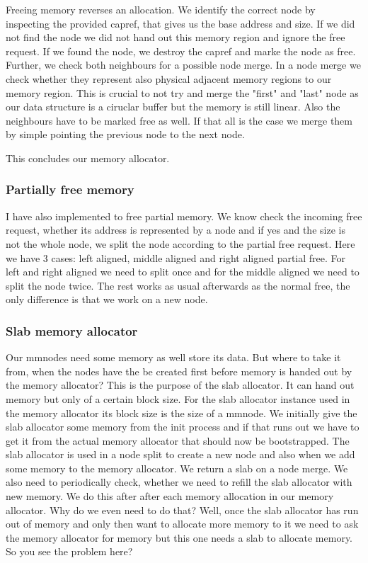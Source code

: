 Freeing memory reverses an allocation. We identify the correct node by inspecting the provided capref, that gives us the base address and size.
If we did not find the node we did not hand out this memory region and ignore the free request.
If we found the node, we destroy the capref and marke the node as free. Further, we check both neighbours for a possible node merge. In a node merge we check whether they represent also physical adjacent memory regions to our memory region. This is crucial to not try and merge the "first" and "last" node as our data structure is a ciruclar buffer but the memory is still linear. Also the neighbours have to be marked free as well. If that all is the case we merge them by simple pointing the previous node to the next node.

This concludes our memory allocator.

\subsubsection{Partially free memory}

I have also implemented to free partial memory. We know check the incoming free request, whether its address is represented by a node and if yes and the size is not the whole node, we split the node according to the partial free request. Here we have 3 cases: left aligned, middle aligned and right aligned partial free. For left and right aligned we need to split once and for the middle aligned we need to split the node twice. The rest works as usual afterwards as the normal free, the only difference is that we work on a new node.

\subsubsection{Slab memory allocator}

Our mmnodes need some memory as well store its data. But where to take it from, when the nodes have the be created first before memory is handed out by the memory allocator?
This is the purpose of the slab allocator. It can hand out memory but only of a certain block size. For the slab allocator instance used in the memory allocator its block size is the size of a mmnode. We initially give the slab allocator some memory from the init process and if that runs out we have to get it from the actual memory allocator that should now be bootstrapped.
The slab allocator is used in a node split to create a new node and also when we add some memory to the memory allocator. We return a slab on a node merge. We also need to periodically check, whether we need to refill the slab allocator with new memory. We do this after after each memory allocation in our memory allocator.
Why do we even need to do that?
Well, once the slab allocator has run out of memory and only then want to allocate more memory to it we need to ask the memory allocator for memory but this one needs a slab to allocate memory. So you see the problem here?

